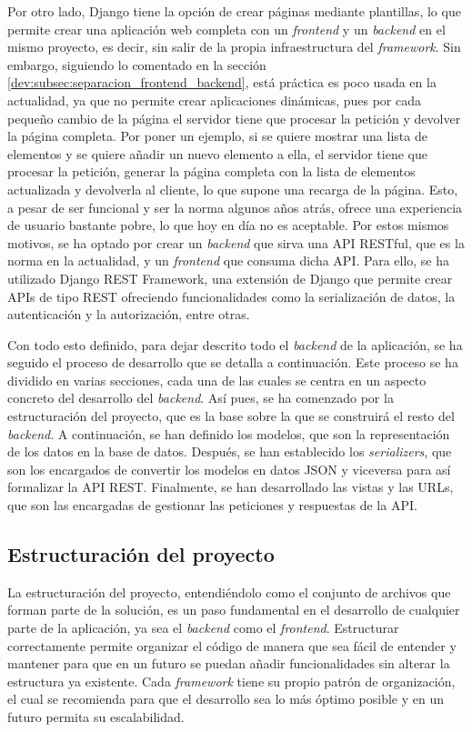 Por otro lado, Django tiene la opción de crear páginas mediante plantillas, lo que permite crear una aplicación web completa con un \textit{frontend} y un \textit{backend} en el mismo proyecto, es decir, sin salir de la propia infraestructura del \textit{framework}. Sin embargo, siguiendo lo comentado en la sección \ref{dev:subsec:separacion_frontend_backend}, está práctica es poco usada en la actualidad, ya que no permite crear aplicaciones dinámicas, pues por cada pequeño cambio de la página el servidor tiene que procesar la petición y devolver la página completa. Por poner un ejemplo, si se quiere mostrar una lista de elementos y se quiere añadir un nuevo elemento a ella, el servidor tiene que procesar la petición, generar la página completa con la lista de elementos actualizada y devolverla al cliente, lo que supone una recarga de la página. Esto, a pesar de ser funcional y ser la norma algunos años atrás, ofrece una experiencia de usuario bastante pobre, lo que hoy en día no es aceptable. Por estos mismos motivos, se ha optado por crear un \textit{backend} que sirva una API RESTful, que es la norma en la actualidad, y un \textit{frontend} que consuma dicha API. Para ello, se ha utilizado Django REST Framework, una extensión de Django que permite crear APIs de tipo REST ofreciendo funcionalidades como la serialización de datos, la autenticación y la autorización, entre otras.

Con todo esto definido, para dejar descrito todo el \textit{backend} de la aplicación, se ha seguido el proceso de desarrollo que se detalla a continuación. Este proceso se ha dividido en varias secciones, cada una de las cuales se centra en un aspecto concreto del desarrollo del \textit{backend}. Así pues, se ha comenzado por la estructuración del proyecto, que es la base sobre la que se construirá el resto del \textit{backend}. A continuación, se han definido los modelos, que son la representación de los datos en la base de datos. Después, se han establecido los \textit{serializers}, que son los encargados de convertir los modelos en datos JSON y viceversa para así formalizar la API REST. Finalmente, se han desarrollado las vistas y las URLs, que son las encargadas de gestionar las peticiones y respuestas de la API.

\subsection{Estructuración del proyecto}
\label{dev:subsec:estructura_proyecto}

La estructuración del proyecto, entendiéndolo como el conjunto de archivos que forman parte de la solución, es un paso fundamental en el desarrollo de cualquier parte de la aplicación, ya sea el \textit{backend} como el \textit{frontend}. Estructurar correctamente permite organizar el código de manera que sea fácil de entender y mantener para que en un futuro se puedan añadir funcionalidades sin alterar la estructura ya existente. Cada \textit{framework} tiene su propio patrón de organización, el cual se recomienda para que el desarrollo sea lo más óptimo posible y en un futuro permita su escalabilidad.

